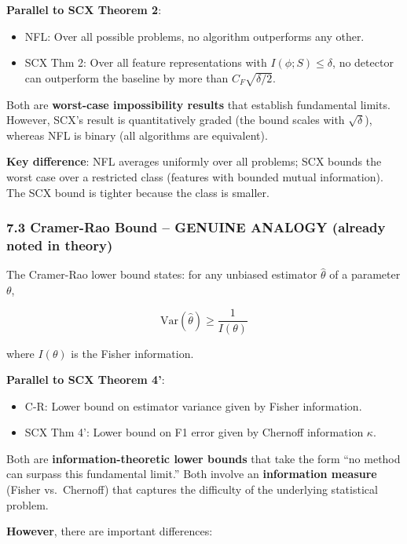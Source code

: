 \documentclass[
  12pt,
]{ctexart}
\providecommand{\tightlist}{%
  \setlength{\itemsep}{0pt}\setlength{\parskip}{0pt}}
\begin{document}
\textbf{Parallel to SCX Theorem 2}:

\begin{itemize}
\tightlist
\item
  NFL: Over all possible problems, no algorithm outperforms any other.
\item
  SCX Thm 2: Over all feature representations with
  \(I(\phi; S) \leq \delta\), no detector can outperform the baseline by
  more than \(C_F\sqrt{\delta/2}\).
\end{itemize}

Both are \textbf{worst-case impossibility results} that establish
fundamental limits. However, SCX's result is quantitatively graded (the
bound scales with \(\sqrt{\delta}\)), whereas NFL is binary (all
algorithms are equivalent).

\textbf{Key difference}: NFL averages uniformly over all problems; SCX
bounds the worst case over a restricted class (features with bounded
mutual information). The SCX bound is tighter because the class is
smaller.

\subsubsection{7.3 Cramer-Rao Bound -- GENUINE ANALOGY (already noted in
theory)}\label{cramer-rao-bound-genuine-analogy-already-noted-in-theory}

The Cramer-Rao lower bound states: for any unbiased estimator
\(\hat{\theta}\) of a parameter \(\theta\),

\[\text{Var}(\hat{\theta}) \geq \frac{1}{I(\theta)}\]

where \(I(\theta)\) is the Fisher information.

\textbf{Parallel to SCX Theorem 4'}:

\begin{itemize}
\tightlist
\item
  C-R: Lower bound on estimator variance given by Fisher information.
\item
  SCX Thm 4': Lower bound on F1 error given by Chernoff information
  \(\kappa\).
\end{itemize}

Both are \textbf{information-theoretic lower bounds} that take the form
``no method can surpass this fundamental limit.'' Both involve an
\textbf{information measure} (Fisher vs.~Chernoff) that captures the
difficulty of the underlying statistical problem.

\textbf{However}, there are important differences:
\end{document}
